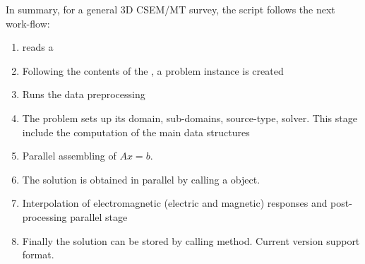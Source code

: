 \documentclass[letterpaper,10pt,english]{sphinxmanual}
\begin{document}
\begin{sphinxVerbatim}[commandchars=\\\{\}]
                              
              
              
              
\end{sphinxVerbatim}

In summary, for a general 3D CSEM/MT survey, the  script follows
the next work-flow:
\begin{enumerate}
%
\item {} 
 reads a 

\item {} 
Following the contents of the , a problem instance is created

\item {} 
Runs the data preprocessing

\item {} 
The problem sets up its domain, sub-domains, source-type, solver. This stage include the computation of the main data structures

\item {} 
Parallel assembling of \(Ax=b\).

\item {} 
The solution is obtained in parallel by calling a   object.

\item {} 
Interpolation of electromagnetic (electric and magnetic) responses and post-processing parallel stage

\item {} 
Finally the solution can be stored by calling  method. Current version support  format.

\end{enumerate}
\end{document}
